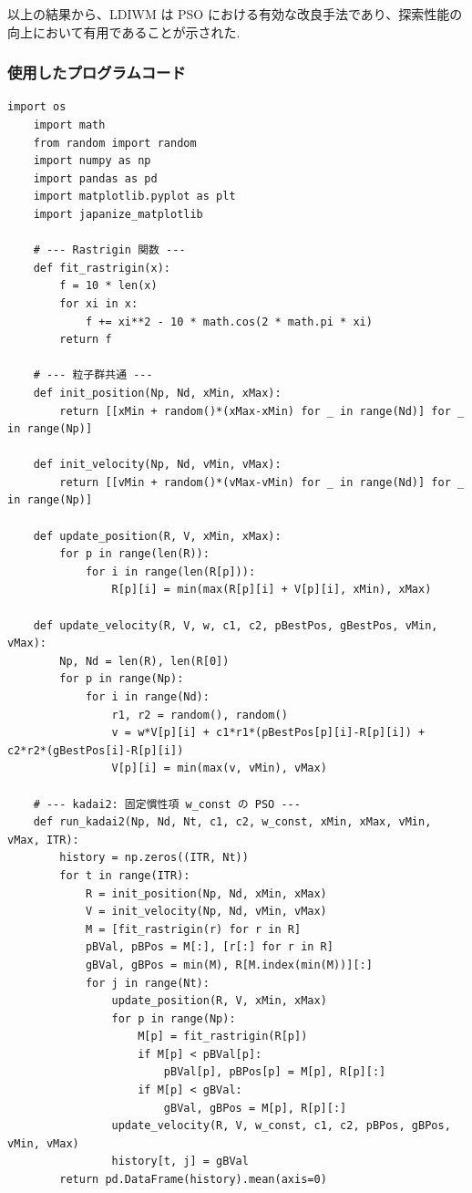 以上の結果から、LDIWM は PSO における有効な改良手法であり、探索性能の向上において有用であることが示された.


\subsubsection{使用したプログラムコード}
\begin{lstlisting}[caption=固定慣性項と LDIWM の収束曲線比較実験コード, label=lst:kadai2_code]
    import os
    import math
    from random import random
    import numpy as np
    import pandas as pd
    import matplotlib.pyplot as plt
    import japanize_matplotlib
    
    # --- Rastrigin 関数 ---
    def fit_rastrigin(x):
        f = 10 * len(x)
        for xi in x:
            f += xi**2 - 10 * math.cos(2 * math.pi * xi)
        return f
    
    # --- 粒子群共通 ---
    def init_position(Np, Nd, xMin, xMax):
        return [[xMin + random()*(xMax-xMin) for _ in range(Nd)] for _ in range(Np)]
    
    def init_velocity(Np, Nd, vMin, vMax):
        return [[vMin + random()*(vMax-vMin) for _ in range(Nd)] for _ in range(Np)]
    
    def update_position(R, V, xMin, xMax):
        for p in range(len(R)):
            for i in range(len(R[p])):
                R[p][i] = min(max(R[p][i] + V[p][i], xMin), xMax)
    
    def update_velocity(R, V, w, c1, c2, pBestPos, gBestPos, vMin, vMax):
        Np, Nd = len(R), len(R[0])
        for p in range(Np):
            for i in range(Nd):
                r1, r2 = random(), random()
                v = w*V[p][i] + c1*r1*(pBestPos[p][i]-R[p][i]) + c2*r2*(gBestPos[i]-R[p][i])
                V[p][i] = min(max(v, vMin), vMax)
    
    # --- kadai2: 固定慣性項 w_const の PSO ---
    def run_kadai2(Np, Nd, Nt, c1, c2, w_const, xMin, xMax, vMin, vMax, ITR):
        history = np.zeros((ITR, Nt))
        for t in range(ITR):
            R = init_position(Np, Nd, xMin, xMax)
            V = init_velocity(Np, Nd, vMin, vMax)
            M = [fit_rastrigin(r) for r in R]
            pBVal, pBPos = M[:], [r[:] for r in R]
            gBVal, gBPos = min(M), R[M.index(min(M))][:]
            for j in range(Nt):
                update_position(R, V, xMin, xMax)
                for p in range(Np):
                    M[p] = fit_rastrigin(R[p])
                    if M[p] < pBVal[p]:
                        pBVal[p], pBPos[p] = M[p], R[p][:]
                    if M[p] < gBVal:
                        gBVal, gBPos = M[p], R[p][:]
                update_velocity(R, V, w_const, c1, c2, pBPos, gBPos, vMin, vMax)
                history[t, j] = gBVal
        return pd.DataFrame(history).mean(axis=0)
    

\end{lstlisting}
